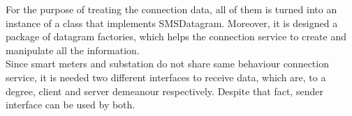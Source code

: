 
For the purpose of treating the connection data, all of them is turned into an instance of a class that implements SMSDatagram. Moreover, it is designed a package of datagram factories, which helps the connection service to create and manipulate all the information. 
\\
Since smart meters and substation do not share same behaviour connection service, it is needed two different interfaces to receive data, which are, to a degree, client and server demeanour respectively. Despite that fact, sender interface can be used by both.
